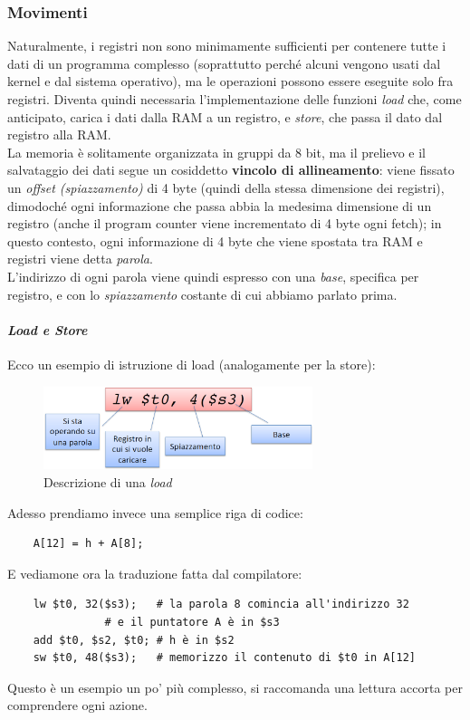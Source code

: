 \documentclass[class=book, crop=false]{standalone}
\begin{document}
\subsubsection{Movimenti}Naturalmente, i registri non sono minimamente sufficienti per contenere tutte i dati di un programma complesso (soprattutto perché alcuni vengono usati dal kernel e dal sistema operativo), ma le operazioni possono essere eseguite solo fra registri. Diventa quindi necessaria l'implementazione delle funzioni \emph{load} che, come anticipato, carica i dati dalla RAM a un registro, e \emph{store}, che passa il dato dal registro alla RAM.\\
La memoria è solitamente organizzata in gruppi da 8 bit, ma il prelievo e il salvataggio dei dati segue un cosiddetto \textbf{vincolo di allineamento}: viene fissato un \textit{offset (spiazzamento)} di 4 byte (quindi della stessa dimensione dei registri), dimodoché ogni informazione che passa abbia la medesima dimensione di un registro (anche il program counter viene incrementato di 4 byte ogni fetch); in questo contesto, ogni informazione di 4 byte che viene spostata tra RAM e registri viene detta \emph{parola}.\\
L'indirizzo di ogni parola viene quindi espresso con una \textit{base}, specifica per registro, e con lo \textit{spiazzamento} costante di cui abbiamo parlato prima.

\paragraph{\textit{Load e Store}}
Ecco un esempio di istruzione di load (analogamente per la store):
\begin{figure}[H]
	\centering
	\includegraphics[width=0.7\textwidth,keepaspectratio]{load}
	\caption{Descrizione di una \emph{load}}
\end{figure}
Adesso prendiamo invece una semplice riga di codice:
\begin{verbatim}
	A[12] = h + A[8];
\end{verbatim}
E vediamone ora la traduzione fatta dal compilatore:
\begin{verbatim}
	lw $t0, 32($s3);   # la parola 8 comincia all'indirizzo 32
			   # e il puntatore A è in $s3
	add $t0, $s2, $t0; # h è in $s2
	sw $t0, 48($s3);   # memorizzo il contenuto di $t0 in A[12]
\end{verbatim}
Questo è un esempio un po' più complesso, si raccomanda una lettura accorta per comprendere ogni azione.
\end{document}
